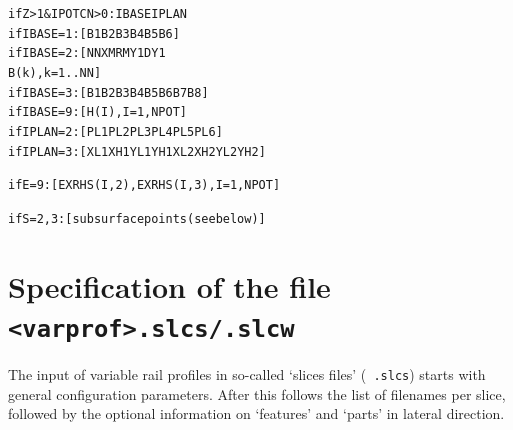 \documentclass[12pt]{report}
\renewcommand{\magenta}[1]{}
\begin{document}
\begin{alltt}
if Z>1 & IPOTCN>0: IBASE   IPLAN
      if IBASE= 1:  [ B1   B2   B3   B4   B5   B6            ]
      if IBASE= 2:  [ NN   XM   RM   Y1   DY1
                      B(k), k=1..NN                          ]
      if IBASE= 3:  [ B1   B2   B3   B4   B5   B6   B7   B8  ]
      if IBASE= 9:  [ H(I), I=1,NPOT                         ]
      if IPLAN= 2:  [ PL1  PL2  PL3  PL4  PL5  PL6           ]
      if IPLAN= 3:  [ XL1  XH1  YL1  YH1  XL2  XH2  YL2  YH2 ]
\magenta{      if IPLAN= 4:  [ NPATCH
                     (XL(I), XH(I), YL(I), YH(I)), I=1,NPATCH
                     (FAC(I,J), J=I+1,NPATCH), I=1,NPATCH-1  ]
}\magenta{
if VARFRC=3:
      if L=0: [ FSTAT  FKIN                                ], MY times
      if L=2: [ FKIN   FLIN1  SABSH1  FLIN2  SABSH2        ], MY times
      if L=3: [ FKIN   FRAT1  SABSH1  FRAT2  SABSH2        ], MY times
      if L=4: [ FKIN   FEXP1  SABSH1  FEXP2  SABSH2        ], MY times
      if L=6: [ FREF   TREF   DFHEAT  DTHEAT               ], MY times
      if L=2,3,4,6: [ MEMDST MEM\_S0                        ]
}

if E=9: [ EXRHS(I,2), EXRHS(I,3), I=1,NPOT    ]


if S=2,3: [ subsurface points (see below) ]
\end{alltt}

\section{Specification of the file {\tt <varprof>.slcs/.slcw}}
\label{sec:spec_slcs}

The input of variable rail profiles in so-called `slices files' ({\tt
.slcs}) starts with general configuration parameters. After this follows
the list of filenames per slice, followed by the optional information on
`features' and `parts' in lateral direction\magenta{\ and information on
surface perturbations}.
\end{document}
